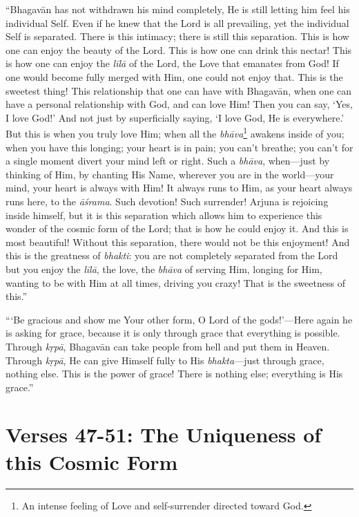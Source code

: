 \enquote{Bhagavān has not withdrawn his mind completely, He is still letting him feel his individual Self. Even if he knew that the Lord is all prevailing, yet the individual Self is separated. There is this intimacy; there is still this separation. This is how one can enjoy the beauty of the Lord. This is how one can drink this nectar! This is how one can enjoy the \textit{līlā} of the Lord, the Love that emanates from God! If one would become fully merged with Him, one could not enjoy that. This is the sweetest thing! This relationship that one can have with Bhagavān, when one can have a personal relationship with God, and can love Him! Then you can say, \enquote{Yes, I love God!} And not just by superficially saying, \enquote{I love God, He is everywhere.} But this is when you truly love Him; when all the \textit{bhāva}\footnote{An intense feeling of Love and self-surrender directed toward God.} awakens inside of you; when you have this longing; your heart is in pain; you can’t breathe; you can’t for a single moment divert your mind left or right. Such a \textit{bhāva}, when---just by thinking of Him, by chanting His Name, wherever you are in the world---your mind, your heart is always with Him! It always runs to Him, as your heart always runs here, to the \textit{āśrama}. Such devotion! Such surrender! Arjuna is rejoicing inside himself, but it is this separation which allows him to experience this wonder of the cosmic form of the Lord; that is how he could enjoy it. And this is most beautiful! Without this separation, there would not be this enjoyment! And this is the greatness of \textit{bhakti}: you are not completely separated from the Lord but you enjoy the \textit{līlā}, the love, the \textit{bhāva} of serving Him, longing for Him, wanting to be with Him at all times, driving you crazy! That is the sweetness of this.}

\enquote{\enquote{Be gracious and show me Your other form, O Lord of the gods!}---Here again he is asking for grace, because it is only through grace that everything is possible. Through \textit{kṛpā}, Bhagavān can take people from hell and put them in Heaven. Through \textit{kṛpā}, He can give Himself fully to His \textit{bhakta}---just through grace, nothing else. This is the power of grace! There is nothing else; everything is His grace.}

\section{Verses 47-51: The Uniqueness of this Cosmic Form}\label{sec-verses-47-51-the-uniqueness-of-this-cosmic-form}

